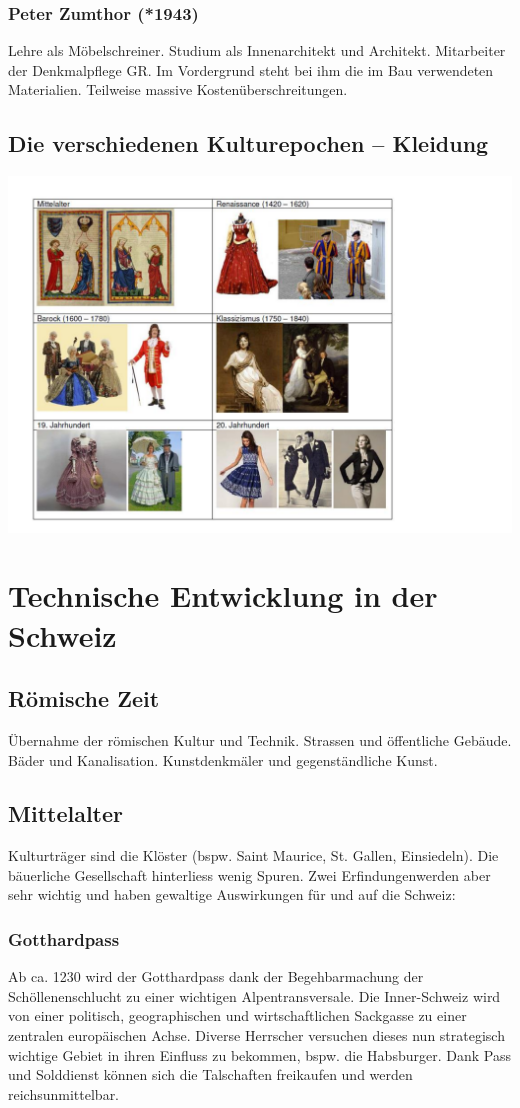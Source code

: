 \documentclass[10pt, openright=true]{scrartcl}
\begin{document}
\subsubsection{Peter Zumthor (*1943)}
Lehre als Möbelschreiner. Studium als Innenarchitekt und Architekt. Mitarbeiter der Denkmalpflege GR. Im Vordergrund steht bei ihm die im Bau verwendeten Materialien. Teilweise massive Kostenüberschreitungen.
\subsection{Die verschiedenen Kulturepochen – Kleidung}
\includegraphics[width=1\textwidth]{images/kleidung}
\section{Technische Entwicklung in der Schweiz}
\subsection{Römische Zeit}
Übernahme der römischen Kultur und Technik. Strassen und öffentliche Gebäude. Bäder und Kanalisation. Kunstdenkmäler und gegenständliche Kunst.
\subsection{Mittelalter}
Kulturträger sind die Klöster (bspw. Saint Maurice, St. Gallen, Einsiedeln). Die bäuerliche Gesellschaft hinterliess wenig Spuren. Zwei \glqq Erfindungen\grqq werden aber sehr wichtig und haben gewaltige Auswirkungen für und auf die Schweiz:
\subsubsection{Gotthardpass}
Ab ca. 1230 wird der Gotthardpass dank der Begehbarmachung der Schöllenenschlucht zu einer wichtigen Alpentransversale. Die Inner-Schweiz wird von einer politisch, geographischen und wirtschaftlichen Sackgasse zu einer zentralen europäischen Achse. Diverse Herrscher versuchen dieses nun strategisch wichtige Gebiet in ihren Einfluss zu bekommen, bspw. die Habsburger. Dank Pass und Solddienst können sich die Talschaften freikaufen und werden reichsunmittelbar. \vspace{-0.5cm}
\end{document}
